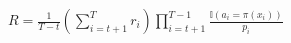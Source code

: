 \documentclass[a4paper,UTF8]{article}
\theoremstyle{definition}
\begin{document}
$R=\frac{1}{T-t}\left(\sum_{i=t+1}^T r_i\right) \prod_{i=t+1}^{T-1} \frac{\mathbb I(a_i=\pi(x_i))}{p_i}$
\end{document}
